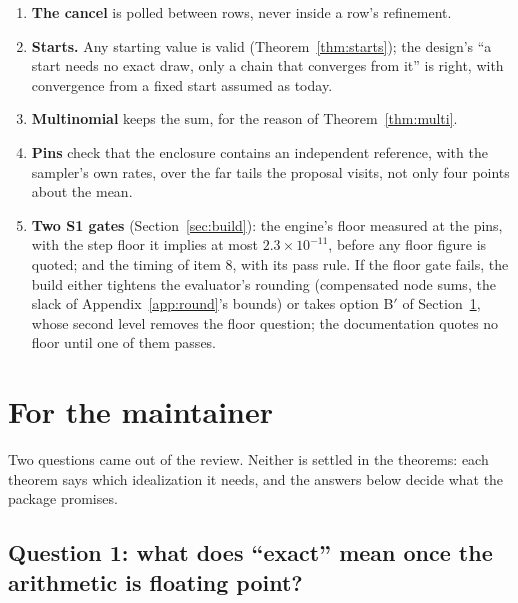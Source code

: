 \begin{enumerate}
\item \textbf{The cancel} is polled between rows, never inside a row's refinement.
\item \textbf{Starts.} Any starting value is valid (Theorem~\ref{thm:starts}); the design's ``a start needs no
exact draw, only a chain that converges from it'' is right, with convergence from a fixed start assumed as today.
\item \textbf{Multinomial} keeps the sum, for the reason of Theorem~\ref{thm:multi}.
\item \textbf{Pins} check that the enclosure contains an independent reference, with the sampler's own rates,
over the far tails the proposal visits, not only four points about the mean.
\item \textbf{Two S1 gates} (Section~\ref{sec:build}): the engine's floor measured at the pins, with the step
floor it implies at most $2.3\times10^{-11}$, before any floor figure is quoted; and the timing of item 8, with its
pass rule. If the floor gate fails, the build either tightens the evaluator's rounding (compensated node sums, the
slack of Appendix~\ref{app:round}'s bounds) or takes option B$'$ of Section~\ref{sec:maint}, whose second level
removes the floor question; the documentation quotes no floor until one of them passes.
\end{enumerate}

\section{For the maintainer}\label{sec:maint}

Two questions came out of the review. Neither is settled in the theorems: each theorem says which idealization
it needs, and the answers below decide what the package promises.

\subsection*{Question 1: what does ``exact'' mean once the arithmetic is floating point?}

